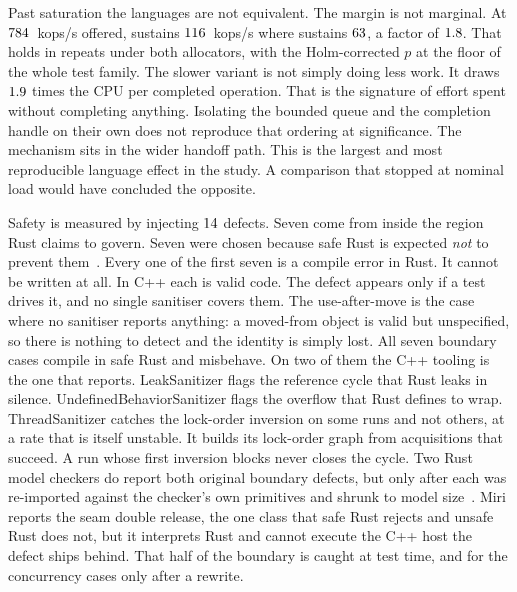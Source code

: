 \documentclass[english,twoside,openright,a4paper,censored,csm,software-track-2020]{HYthesisML}
\begin{document}
Past saturation the languages are not equivalent. The margin is not marginal. At
$784$~kops/s offered, \OverloadSustainedFaster{} sustains
$116$~kops/s where \OverloadSustainedSlower{} sustains
$63$, a factor of $1.8$. That holds in \OverloadThrAgree{}
repeats under both allocators, with the Holm-corrected $p$ at the floor of the whole
test family. The slower variant is not simply doing less work. It draws
$1.9$ times the CPU per completed operation. That is the signature of
effort spent without completing anything. Isolating the bounded queue and the completion
handle on their own does not reproduce that ordering at significance. The mechanism sits
in the wider handoff path. This is the largest and most reproducible language effect in
the study. A comparison that stopped at nominal load would have concluded the opposite.

Safety is measured by injecting $14$ defects. Seven come from inside the
region Rust claims to govern. Seven were chosen because safe Rust is expected \emph{not}
to prevent them~\cite{natella2016fault}. Every one of the first seven is a compile error
in Rust. It cannot be written at all. In C++ each is valid code. The defect appears only
if a test drives it, and no single sanitiser covers them. The use-after-move is the case
where no sanitiser reports anything: a moved-from object is valid but unspecified, so
there is nothing to detect and the identity is simply lost. All seven boundary cases
compile in safe Rust and misbehave. On two of them the C++ tooling is the one that
reports. LeakSanitizer flags the reference cycle that Rust leaks in silence.
UndefinedBehaviorSanitizer flags the overflow that Rust defines to wrap. ThreadSanitizer
catches the lock-order inversion on some runs and not others, at a rate that is itself
unstable. It builds its lock-order graph from acquisitions that succeed. A run whose first
inversion blocks never closes the cycle. Two Rust model checkers do report both original boundary defects, but only after
each was re-imported against the checker's own primitives and shrunk to model
size~\cite{bornholt2021shardstore}. Miri reports the seam double release, the one class
that safe Rust rejects and unsafe Rust does not, but it interprets Rust and cannot
execute the C++ host the defect ships behind. That half of the boundary is caught at test
time, and for the concurrency cases only after a rewrite.
\end{document}
